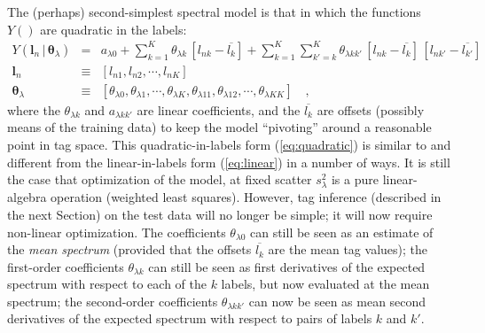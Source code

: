 \documentclass[12pt, preprint]{aastex}
\newcommand{\set}[1]{\bm{#1}}
\newcommand{\mean}[1]{\overline{#1}}
\newcommand{\given}{\,|\,}
\begin{document}
The (perhaps) second-simplest spectral model is that in which the
functions $Y()$ are quadratic in the labels:
\begin{eqnarray}
Y(\set{l}_n\given\set{\theta}_\lambda) &=&
 a_{\lambda 0} + \sum_{k=1}^K \theta_{\lambda k}\,[l_{nk} - \mean{l_k}]
 + \sum_{k=1}^K \sum_{k'=k}^K \theta_{\lambda kk'}\,[l_{nk} - \mean{l_k}]\,[l_{nk'} - \mean{l_{k'}}]
\label{eq:quadratic}\\
\set{l}_n &\equiv& [l_{n1}, l_{n2}, \cdots, l_{nK}]
\\
\set{\theta}_\lambda &\equiv& [\theta_{\lambda 0}, \theta_{\lambda 1}, \cdots, \theta_{\lambda K},
                            \theta_{\lambda 11}, \theta_{\lambda 12}, \cdots, \theta_{\lambda KK}]
\quad ,
\end{eqnarray}
where the $\theta_{\lambda k}$ and $a_{\lambda kk'}$ are linear coefficients, and
the $\mean{l_k}$ are offsets (possibly means of the training data) to
keep the model ``pivoting'' around a reasonable point in tag space.
This quadratic-in-labels form (\ref{eq:quadratic}) is similar to and
different from the linear-in-labels form (\ref{eq:linear}) in a number
of ways.
It is still the case that optimization of the model, at fixed scatter
$s_\lambda^2$ is a pure linear-algebra operation (weighted least
squares).
However, tag inference (described in the next Section) on the test
data will no longer be simple; it will now require non-linear
optimization.
The coefficients $\theta_{\lambda 0}$ can still be seen as an estimate of the
\emph{mean spectrum} (provided that the offsets $\mean{l_k}$ are the
mean tag values); the first-order coefficients $\theta_{\lambda k}$ can still
be seen as first derivatives of the expected spectrum with respect to
each of the $k$ labels, but now evaluated at the mean spectrum; the
second-order coefficients $\theta_{\lambda kk'}$ can now be seen as mean
second derivatives of the expected spectrum with respect to pairs of
labels $k$ and $k'$.
\end{document}
